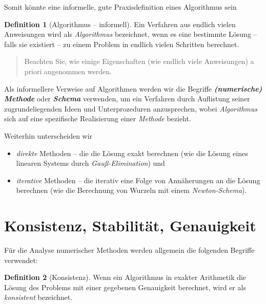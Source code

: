 \documentclass[
]{book}
\providecommand{\tightlist}{%
  \setlength{\itemsep}{0pt}\setlength{\parskip}{0pt}}
\newenvironment {JHSAYS} [0] {\begin{quote}\color{jhsc}} {\end{quote}}
\theoremstyle{definition}
\newtheorem{definition}{Definition}[chapter]
\theoremstyle{definition}
\theoremstyle{definition}
\theoremstyle{definition}
\theoremstyle{remark}
\begin{document}
Somit könnte eine informelle, gute Praxisdefinition eines Algorithmus sein

\begin{definition}[Algorithmus -- informell]
\protect\hypertarget{def:info-algorithm}{}\label{def:info-algorithm}Ein Verfahren aus endlich vielen Anweisungen wird als \emph{Algorithmus} bezeichnet, wenn es eine bestimmte Lösung -- falls sie existiert -- zu einem Problem in endlich vielen Schritten berechnet.
\end{definition}

\leavevmode\hypertarget{rem-coors}{}%
\begin{JHSAYS}
Beachten Sie, wie einige Eigenschaften (wie endlich viele Anweisungen) a priori angenommen werden.

\end{JHSAYS}

Als informellere Verweise auf Algorithmen werden wir die Begriffe \textbf{\emph{(numerische) Methode}} oder \textbf{\emph{Schema}} verwenden, um ein Verfahren durch Auflistung seiner zugrundeliegenden Ideen und Unterprozeduren anzusprechen, wobei \emph{Algorithmus} sich auf eine spezifische Realisierung einer \emph{Methode} bezieht.

Weiterhin unterscheiden wir

\begin{itemize}
\tightlist
\item
  \emph{direkte} Methoden -- die die Lösung exakt berechnen (wie die Lösung eines linearen Systems durch \emph{Gauß-Elimination}) und
\item
  \emph{iterative} Methoden -- die iterativ eine Folge von Annäherungen an die Lösung berechnen (wie die Berechnung von Wurzeln mit einem \emph{Newton-Schema}).
\end{itemize}

\hypertarget{konsistenz-stabilituxe4t-genauigkeit}{%
\section{Konsistenz, Stabilität, Genauigkeit}\label{konsistenz-stabilituxe4t-genauigkeit}}

Für die Analyse numerischer Methoden werden allgemein die folgenden Begriffe verwendet:

\begin{definition}[Konsistenz]
\protect\hypertarget{def:consistency}{}\label{def:consistency}Wenn ein Algorithmus in exakter Arithmetik die Lösung des Problems mit einer gegebenen Genauigkeit berechnet, wird er als \emph{konsistent} bezeichnet.
\end{definition}
\end{document}
